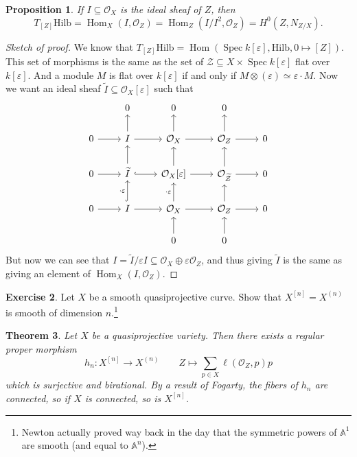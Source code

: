 \documentclass[leqno, openany]{memoir}
\newtheorem{thm}{Theorem}[section]
\newtheorem{prop}[thm]{Proposition}
\theoremstyle{definition}
\newtheorem{exer}[thm]{Exercise}
\theoremstyle{remark}
\theoremstyle{plain}
\theoremstyle{definition}
\theoremstyle{remark}
\newcommand{\A}{\mathbb{A}}
\newcommand{\ep}{\varepsilon}
\newcommand{\mc}[1]{\mathcal{#1}}
\newcommand{\mr}[1]{\mathrm{#1}}
\newcommand{\wt}[1]{\widetilde{#1}}
\DeclareMathOperator{\Hom}{Hom}
\DeclareMathOperator{\Spec}{Spec}
\begin{document}
\begin{prop}
    If $I \subseteq \mc{O}_X$ is the ideal sheaf of $Z$, then 
    \[ T_{[Z]} \mr{Hilb} = \Hom_X(I, \mc{O}_Z) = \Hom_Z(I/I^2, \mc{O}_Z) = H^0(Z, N_{Z/X}). \]
\end{prop}

\begin{proof}[Sketch of proof]
    We know that $T_{[Z]} \mr{Hilb} = \Hom(\Spec k[\ep], \mr{Hilb}, 0 \mapsto [Z])$. This set of morphisms is the same as the set of $\mc{Z} \subseteq X \times \Spec k[\ep]$ flat over $k[\ep]$. And a module $M$ is flat over $k[\ep]$ if and only if $M \otimes (\ep) \simeq \ep \cdot M$. Now we want an ideal sheaf $\wt{I} \subseteq \mc{O}_X[\ep]$ such that
    \begin{equation*}
    \begin{tikzcd}
        & 0 & 0 & 0 \\
        0 \ar{r} & I \ar{r} \ar{u} & \mc{O}_X \ar{u} \ar{r} & \mc{O}_Z \ar{r} \ar{u} & 0 \\
        0 \ar{r} & \wt{I} \ar{u} \ar[hookrightarrow]{r} & \mc{O}_X[\ep] \ar{r} \ar{u} & \mc{O}_{\wt{\mc{Z}}} \ar{r} \ar{u} & 0 \\
        0 \ar{r} & I \ar{r} \ar[hookrightarrow]{u}{\cdot \ep} & \mc{O}_X \ar{u}{\cdot \ep} \ar{r} & \mc{O}_Z \ar{r} \ar{u} & 0 \\
        & & 0 \ar{u} & 0 \ar{u}
    \end{tikzcd}
    \end{equation*}
    But now we can see that $I = \wt{I}/\ep I \subseteq \mc{O}_X \oplus \ep \mc{O}_Z$, and thus giving $\wt{I}$ is the same as giving an element of $\Hom_X(I, \mc{O}_Z)$.
\end{proof}

\begin{exer}
    Let $X$ be a smooth quasiprojective curve. Show that $X^{[n]} = X^{(n)}$ is smooth of dimension $n$.\footnote{Newton actually proved way back in the day that the symmetric powers of $\A^1$ are smooth (and equal to $\A^n$).}
\end{exer}

\begin{thm}
    Let $X$ be a quasiprojective variety. Then there exists a regular proper morphism 
    \[ h_n \colon X^{[n]} \to X^{(n)} \qquad Z \mapsto \sum_{p \in X} \ell(\mc{O}_Z, p) p \]
    which is surjective and birational. By a result of Fogarty, the fibers of $h_n$ are connected, so if $X$ is connected, so is $X^{[n]}$.
\end{thm}
\end{document}
